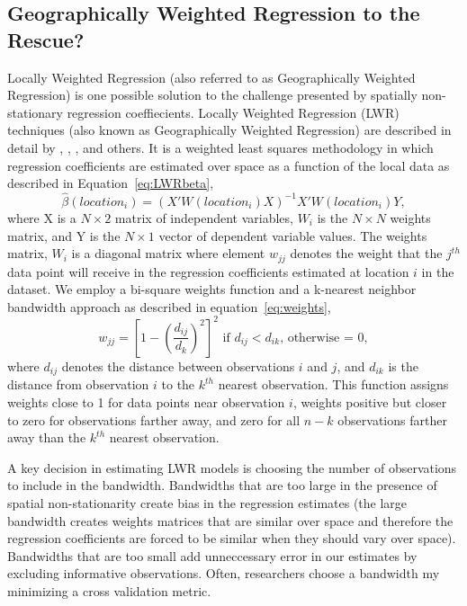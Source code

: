 \documentclass{article}\usepackage[]{graphicx}\usepackage[]{color}
\begin{document}
\subsection{Geographically Weighted Regression to the Rescue?}
Locally Weighted Regression (also referred to as Geographically Weighted Regression) is one possible solution to the challenge presented by spatially non-stationary regression coeffiecients. Locally Weighted Regression (LWR) techniques (also known as Geographically Weighted Regression) are described in detail by \citet{Cleveland1988}, \citet{Brunsdon1998b}, \citet{Fotheringham2002}, and others. It is a weighted least squares methodology in which regression coefficients are estimated over space as a function of the local data as described in Equation~\eqref{eq:LWRbeta},
\begin{equation}\label{eq:LWRbeta}
\hat{\beta}(location_i) = (X'W(location_i)X)^{-1}X'W(location_i)Y,
\end{equation}
where X is a $N \times 2$ matrix of independent variables, $W_i$ is the $N \times N$ weights matrix, and Y is the $N \times 1$ vector of dependent variable values. The weights matrix, $W_i$ is a diagonal matrix where element $w_{jj}$ denotes the weight that the $j^{th}$ data point will receive in the regression coefficients estimated at location $i$ in the dataset. We employ a bi-square weights function and a k-nearest neighbor bandwidth approach as described in equation~\eqref{eq:weights}, 
\begin{equation}\label{eq:weights}
w_{jj}=\left[1-\left(\frac{d_{ij}}{d_{k}}\right)^2 \right]^2 \textrm{ if }d_{ij}<d_{ik}\textrm{, otherwise = 0},
\end{equation}
where $d_{ij}$ denotes the distance between observations $i$ and $j$, and $d_{ik}$ is the distance from observation $i$ to the $k^{th}$ nearest observation. This function assigns weights close to 1 for data points near observation $i$, weights positive but closer to zero for observations farther away, and zero for all $n-k$ observations farther away than the $k^{th}$ nearest observation. 

A key decision in estimating LWR models is choosing the number of observations to include in the bandwidth. Bandwidths that are too large in the presence of spatial non-stationarity create bias in the regression estimates (the large bandwidth creates weights matrices that are similar over space and therefore the regression coefficients are forced to be similar when they should vary over space). Bandwidths that are too small add unneccessary error in our estimates by excluding informative observations. Often, researchers choose a bandwidth my minimizing a cross validation metric. 
\end{document}
